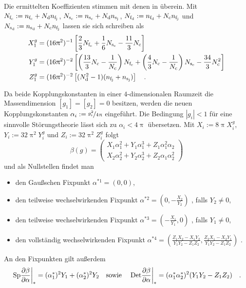   Die ermittelten Koeffizienten stimmen mit denen in \cite{Scale_of_dark_QCD} 
  überein. Mit $N_{\text{f}_\text{c}} := n_{\text{f}_\text{c}} +N_\text{d} n_{\text{f}_\text{j}}$, $N_{\text{s}_\text{c}} := n_{\text{s}_\text{c}} +N_\text{d} n_{\text{s}_\text{j}}$, 
  $N_{\text{f}_\text{d}} := n_{\text{f}_\text{d}} +N_\text{c} n_{\text{f}_\text{j}}$ und $N_{\text{s}_\text{d}} := n_{\text{s}_\text{d}} +N_\text{c} n_{\text{f}_\text{j}}$ lassen sie sich 
  schreiben als
  \begin{align}
   X_1^g &= (16 \uppi^2)^{-1} \left[
    \frac{2}{3} N_{\text{f}_\text{c}} + \frac{1}{6} N_{\text{s}_\text{c}} - \frac{11}{3} N_\text{c} \right] 
    \label{eq:beta_QCDxdQCD:X1g} \\ 
   Y_1^g &= (16 \uppi^2)^{-2} \left[ \left(\frac{13}{3}N_\text{c}-\frac{1}{N_\text{c}}\right)
    N_{\text{f}_\text{c}} + \left( \frac{4}{3} N_\text{c} -\frac{1}{N_\text{c}}\right)N_{\text{s}_\text{c}} -\frac{34}{3}
    N_\text{c}^2\right] \label{eq:beta_QCDxdQCD:Y1g}\\
   Z_1^g &= (16 \uppi^2)^{-2}\left[(N_\text{d}^2-1)(n_{\text{f}_\text{j}} + n_{\text{s}_\text{j}}) \right] \quad .
   \label{eq:beta_QCDxdQCD:Z1g}
  \end{align}

  Da beide Kopplungskonstanten in einer $4$-dimensionalen Raumzeit die 
  Massendimension $[g_1]=[g_2]=0$ besitzen, werden die neuen 
  Kopplungskonstanten $\alpha_i := \nicefrac{g_i^2}{4 \uppi}$ 
  eingeführt. Die Bedingung $|g_i|<1$ für eine sinnvolle Störungstheorie lässt 
  sich zu $\alpha_i<4\uppi$ übersetzen. Mit 
  $X_i := 8\uppi X_i^g $, $Y_i := 32\uppi^2 Y_i^g $ und 
  $Z_i := 32\uppi^2 Z_i^g $ folgt
  \begin{equation}
   \beta (g) = \begin{pmatrix}
                     X_1 \alpha_1^2 + Y_1 \alpha_1^3 + Z_1 \alpha_1^2 \alpha_2\\ 
                     X_2 \alpha_2^2 + Y_2 \alpha_2^3 + Z_2 \alpha_1 \alpha_2^2 
                    \end{pmatrix} \label{eq:beta_QCDxdQCD:beta_alpha}
  \end{equation}
  und als Nullstellen findet man 
  \begin{itemize}
    \item den Gaußschen Fixpunkt $\alpha^{*1}=(0,0)$,
    \item den teilweise wechselwirkenden Fixpunkt 
	$\alpha^{*2}=\left(0,-\frac{X_2}{Y_2}\right)$ , falls $Y_2\neq 0$,
    \item den teilweise wechselwirkenden Fixpunkt 
	$\alpha^{*3}=\left(-\frac{X_1}{Y_1},0\right)$ , falls $Y_1\neq 0$,
    \item den vollständig wechselwirkenden Fixpunkt 
	$\alpha^{*4}=\left(\frac{Z_1X_2-X_1Y_2}{Y_1Y_2-Z_1Z_2},
	\frac{Z_2X_1-X_2Y_1}{Y_1Y_2-Z_1Z_2}\right)$ .
  \end{itemize}
  An den Fixpunkten gilt außerdem 
  \begin{equation}
    \left. \text{Sp} \frac{\partial \beta}{\partial \alpha} \right|_*=(\alpha_1^*)^2 Y_1+(\alpha_2^*)^2 Y_2
    \quad
    \text{sowie}
    \quad
    \left. \text{Det} \frac{\partial \beta}{\partial \alpha} \right|_*=(\alpha_1^*\alpha_2^*)^2(Y_1Y_2-Z_1Z_2) \quad.
    \label{eq:beta_QCDxdQCD:spur_determinante}
  \end{equation}

